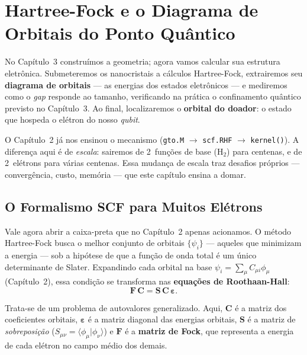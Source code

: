\documentclass[11pt,a4paper,openany]{book}
\newcommand{\code}[1]{\texttt{#1}}
\newcommand{\qubit}{\emph{qubit}}
\begin{document}
\chapter{Hartree-Fock e o Diagrama de Orbitais do Ponto Quântico}
\label{cap:hf}

No Capítulo~3 construímos a geometria; agora vamos calcular sua estrutura
eletrônica. Submeteremos os nanocristais a cálculos Hartree-Fock, extrairemos seu
\textbf{diagrama de orbitais} --- as energias dos estados eletrônicos --- e
mediremos como o \emph{gap} responde ao tamanho, verificando na prática o
confinamento quântico previsto no Capítulo~3. Ao final, localizaremos o
\textbf{orbital do doador}: o estado que hospeda o elétron do nosso \qubit{}.

O Capítulo~2 já nos ensinou o mecanismo (\code{gto.M} $\rightarrow$ \code{scf.RHF}
$\rightarrow$ \code{kernel()}). A diferença aqui é de \emph{escala}: sairemos de
2~funções de base (H$_2$) para centenas, e de 2~elétrons para várias centenas.
Essa mudança de escala traz desafios próprios --- convergência, custo, memória ---
que este capítulo ensina a domar.

\section{O Formalismo SCF para Muitos Elétrons}
\label{sec:formalismo}

Vale agora abrir a caixa-preta que no Capítulo~2 apenas acionamos. O método
Hartree-Fock busca o melhor conjunto de orbitais $\{\psi_i\}$ --- aqueles que
minimizam a energia --- sob a hipótese de que a função de onda total é um único
determinante de Slater. Expandindo cada orbital na base
$\psi_i = \sum_\mu C_{\mu i}\phi_\mu$ (Capítulo~2), essa condição se transforma nas
\textbf{equações de Roothaan-Hall}:
\begin{equation}
  \mathbf{F}\,\mathbf{C} = \mathbf{S}\,\mathbf{C}\,\boldsymbol{\varepsilon}.
  \label{eq:roothaan}
\end{equation}

\noindent
Trata-se de um problema de autovalores generalizado. Aqui, $\mathbf{C}$ é a matriz
dos coeficientes orbitais, $\boldsymbol{\varepsilon}$ é a matriz diagonal das
energias orbitais, $\mathbf{S}$ é a matriz de \emph{sobreposição}
($S_{\mu\nu} = \langle\phi_\mu|\phi_\nu\rangle$) e $\mathbf{F}$ é a
\textbf{matriz de Fock}, que representa a energia de cada elétron no campo médio
dos demais.
\end{document}
